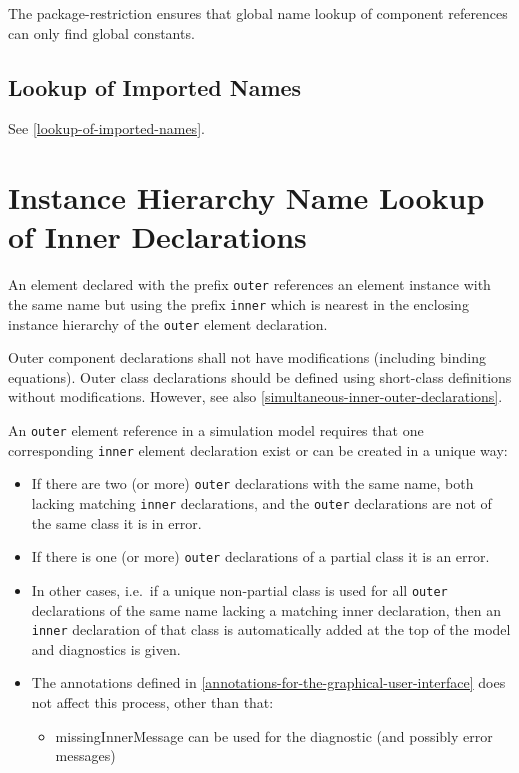 \begin{nonnormative}
The package-restriction ensures that global name lookup of
component references can only find global constants.
\end{nonnormative}

\subsection{Lookup of Imported Names}\label{lookup-of-imported-names1}

See \cref{lookup-of-imported-names}.

\section{Instance Hierarchy Name Lookup of Inner Declarations}\label{instance-hierarchy-name-lookup-of-inner-declarations}

An element declared with the prefix \lstinline!outer! references an element instance
with the same name but using the prefix \lstinline!inner! which is nearest in the
enclosing instance hierarchy of the \lstinline!outer! element declaration.

Outer component declarations shall not have modifications (including binding equations).
Outer class declarations should be defined using short-class
definitions without modifications. However, see also \cref{simultaneous-inner-outer-declarations}.

An \lstinline!outer! element reference in a simulation model requires that one
corresponding \lstinline!inner! element declaration exist or can be created in a
unique way:
\begin{itemize}
\item
  If there are two (or more) \lstinline!outer! declarations with the same name, both
  lacking matching \lstinline!inner! declarations, and the \lstinline!outer! declarations are
  not of the same class it is in error.
\item
  If there is one (or more) \lstinline!outer! declarations of a partial class it is
  an error.
\item
  In other cases, i.e.\ if a unique non-partial class is used for all
  \lstinline!outer! declarations of the same name lacking a matching inner
  declaration, then an \lstinline!inner! declaration of that class is automatically
  added at the top of the model and diagnostics is given.
\item
  The annotations defined in \cref{annotations-for-the-graphical-user-interface} does not affect this process,
  other than that:

  \begin{itemize}
  \item
    missingInnerMessage can be used for the diagnostic (and possibly
    error messages)
  \end{itemize}
\end{itemize}

